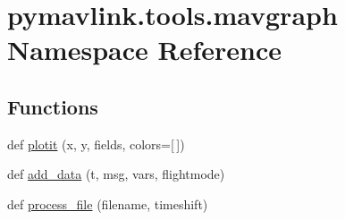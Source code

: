 \hypertarget{namespacepymavlink_1_1tools_1_1mavgraph}{}\section{pymavlink.\+tools.\+mavgraph Namespace Reference}
\label{namespacepymavlink_1_1tools_1_1mavgraph}
\subsection*{Functions}
\begin{DoxyCompactItemize}
\item 
def \hyperlink{namespacepymavlink_1_1tools_1_1mavgraph_ac4c25ed1ed8661bb69619e15992c1c81}{plotit} (x, y, fields, colors=\mbox{[}$\,$\mbox{]})
\item 
def \hyperlink{namespacepymavlink_1_1tools_1_1mavgraph_a798da2b2c7d6fe51f1eecc3dcba95079}{add\+\_\+data} (t, msg, vars, flightmode)
\item 
def \hyperlink{namespacepymavlink_1_1tools_1_1mavgraph_a47959158ff9478cba6dd7fb7000655ea}{process\+\_\+file} (filename, timeshift)
\end{DoxyCompactItemize}
